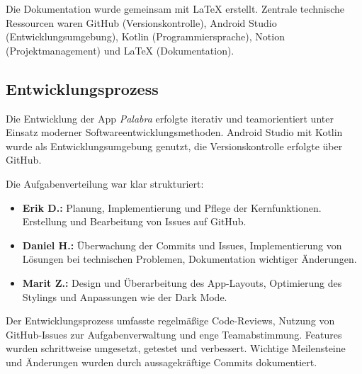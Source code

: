 \documentclass[12pt,a4paper]{article}
\begin{document}
Die Dokumentation wurde gemeinsam mit LaTeX erstellt. Zentrale technische Ressourcen waren GitHub (Versionskontrolle), Android Studio (Entwicklungsumgebung), Kotlin (Programmiersprache), Notion (Projektmanagement) und LaTeX (Dokumentation).

\subsection{Entwicklungsprozess}
Die Entwicklung der App \textit{Palabra} erfolgte iterativ und teamorientiert unter Einsatz moderner Softwareentwicklungsmethoden. Android Studio mit Kotlin wurde als Entwicklungsumgebung genutzt, die Versionskontrolle erfolgte über GitHub.

Die Aufgabenverteilung war klar strukturiert:
\begin{itemize}
    \item \textbf{Erik D.:} Planung, Implementierung und Pflege der Kernfunktionen. Erstellung und Bearbeitung von Issues auf GitHub.
    \item \textbf{Daniel H.:} Überwachung der Commits und Issues, Implementierung von Lösungen bei technischen Problemen, Dokumentation wichtiger Änderungen.
    \item \textbf{Marit Z.:} Design und Überarbeitung des App-Layouts, Optimierung des Stylings und Anpassungen wie der Dark Mode.
\end{itemize}

Der Entwicklungsprozess umfasste regelmäßige Code-Reviews, Nutzung von GitHub-Issues zur Aufgabenverwaltung und enge Teamabstimmung. Features wurden schrittweise umgesetzt, getestet und verbessert. Wichtige Meilensteine und Änderungen wurden durch aussagekräftige Commits dokumentiert.
\end{document}
